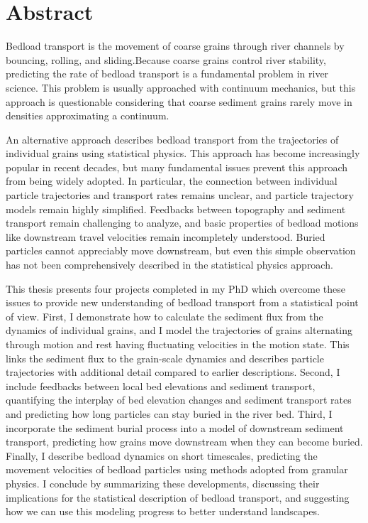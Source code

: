 
\chapter{Abstract}

Bedload transport is the movement of coarse grains through river channels by bouncing, rolling, and sliding.Because coarse grains control river stability, predicting the rate of bedload transport is a fundamental problem in river science. This problem is usually approached with continuum mechanics, but this approach is questionable considering that coarse sediment grains rarely move in densities approximating a continuum.

An alternative approach describes bedload transport from the trajectories of individual grains using statistical physics. This approach has become increasingly popular in recent decades, but many fundamental issues prevent this approach from being widely adopted. In particular, the connection between individual particle trajectories and transport rates remains unclear, and particle trajectory models remain highly simplified. Feedbacks between topography and sediment transport remain challenging to analyze, and basic properties of bedload motions like downstream travel velocities remain incompletely understood. Buried particles cannot appreciably move downstream, but even this simple observation has not been comprehensively described in the statistical physics approach.

This thesis presents four projects completed in my PhD which overcome these issues to provide new understanding of bedload transport from a statistical point of view. First, I demonstrate how to calculate the sediment flux from the dynamics of individual grains, and I model the trajectories of grains alternating through motion and rest having fluctuating velocities in the motion state. This links the sediment flux to the grain-scale dynamics and describes particle trajectories with additional detail compared to earlier descriptions. Second, I include feedbacks between local bed elevations and sediment transport, quantifying the interplay of bed elevation changes and sediment transport rates and predicting how long particles can stay buried in the river bed. Third, I incorporate the sediment burial process into a model of downstream sediment transport, predicting how grains move downstream when they can become buried. Finally, I describe bedload dynamics on short timescales, predicting the movement velocities of bedload particles using methods adopted from granular physics. I conclude by summarizing these developments, discussing their implications for the statistical description of bedload transport, and suggesting how we can use this modeling progress to better understand landscapes.


